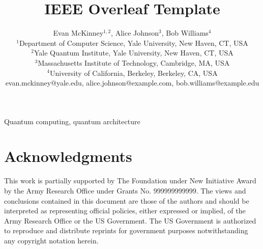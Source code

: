\documentclass[10pt,conference]{IEEEtran}
\title{IEEE Overleaf Template}
\author{
    Evan McKinney$^{1,2}$, Alice Johnson$^{3}$, Bob Williams$^{4}$ \\
    $^{1}$Department of Computer Science, Yale University, New Haven, CT, USA \\
    $^{2}$Yale Quantum Institute, Yale University, New Haven, CT, USA \\
    $^{3}$Massachusetts Institute of Technology, Cambridge, MA, USA \\
    $^{4}$University of California, Berkeley, Berkeley, CA, USA \\
    evan.mckinney@yale.edu, alice.johnson@example.com, bob.williams@example.edu
}
\begin{document}
\maketitle



\begin{IEEEkeywords}
Quantum computing, quantum architecture
\end{IEEEkeywords}




\section*{Acknowledgments}
This work is partially supported by The Foundation under New Initiative Award by the Army Research Office under Grants No. 999999999999. The views and conclusions contained in this document are those of the authors and should be interpreted as representing official policies, either expressed or implied, of the Army Research Office or the US Government. The US Government is authorized to reproduce and distribute reprints for government purposes notwithstanding any copyright notation herein.


\nocite{*}

\end{document}
